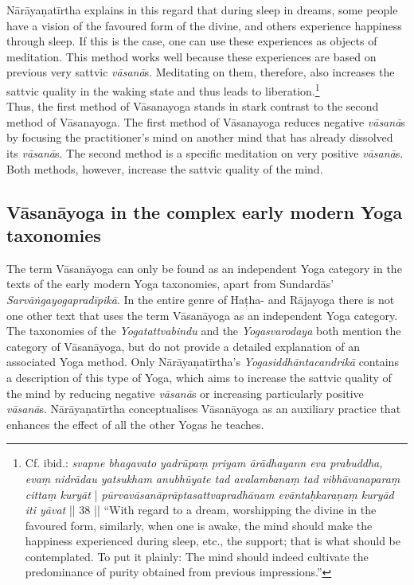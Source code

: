 Nārāyaṇatīrtha explains in this regard that during sleep in dreams, some people have a vision of the favoured form of the divine, and others experience happiness through sleep. If this is the case, one can use these experiences as objects of meditation. This method works well because these experiences are based on previous very sattvic \textit{vāsanā}s. Meditating on them, therefore, also increases the sattvic quality in the waking state and thus leads to liberation.\footnote{Cf. ibid.: \textit{svapne bhagavato yadrūpaṃ priyam ārādhayann eva prabuddha, evaṃ nidrādau yatsukham anubhūyate tad avalambanaṃ tad vibhāvanaparaṃ cittaṃ kuryāt} | \textit{pūrvavāsanāprāptasattvapradhānam evāntaḥkaraṇaṃ kuryād iti yāvat} || 38 || ``With regard to a dream, worshipping the divine in the favoured form, similarly, when one is awake, the mind should make the happiness experienced during sleep, etc., the support; that is what should be contemplated. To put it plainly: The mind should indeed cultivate the predominance of purity obtained from previous impressions.''}\\

Thus, the first method of Vāsanayoga stands in stark contrast to the second method of Vāsanayoga. The first method of Vāsanayoga reduces negative \textit{vāsanā}s by focusing the practitioner's mind on another mind that has already dissolved its \textit{vāsanā}s. The second method is a specific meditation on very positive \textit{vāsanā}s. Both methods, however, increase the sattvic quality of the mind.      

\subsection{Vāsanāyoga in the complex early modern Yoga taxonomies}

The term Vāsanāyoga can only be found as an independent Yoga category in the texts of the early modern Yoga taxonomies, apart from Sundardās' \emph{Sarvāṅgayogapradīpikā}. In the entire genre of Haṭha- and Rājayoga there is not one other text that uses the term Vāsanāyoga as an independent Yoga category. The taxonomies of the \emph{Yogatattvabindu} and the \emph{Yogasvarodaya} both mention the category of Vāsanāyoga, but do not provide a detailed explanation of an associated Yoga method. Only Nārāyaṇatīrtha's \emph{Yogasiddhāntacandrikā} contains a description of this type of Yoga, which aims to increase the sattvic quality of the mind by reducing negative \textit{vāsanā}s or increasing particularly positive \emph{vāsanā}s. Nārāyaṇatīrtha conceptualises Vāsanāyoga as an auxiliary practice that enhances the effect of all the other Yogas he teaches.

